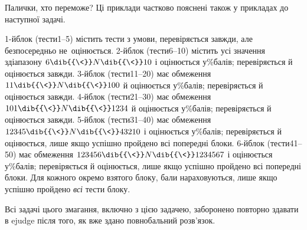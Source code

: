 \begin{problemAllDefault}{Палички, хто переможе?}
\Note Ці приклади частково пояснені також у прикладах до наступної задачі.

{

\Scoring{}\label{text:201819-2-D-scoring-begin}
\mbox{1-й}\nolinebreak[3] блок (тести\nolinebreak[3] \mbox{1--5}) містить тести з умови, перевіряється завжди, але безпосередньо не~оцінюється.
%
\mbox{2-й}\nolinebreak[3] блок (тести\nolinebreak[3] \mbox{6--10}) містить усі значення з\nolinebreak[3] діапазону $6\dib{{\<}}N\dib{{\<}}10$ і оцінюється у\%\nolinebreak[3] балів; перевіряється й оцінюється завжди.
%
\mbox{3-й}\nolinebreak[3] блок (тести\nolinebreak[3] \mbox{11--20}) має обмеження $11\dib{{\<}}N\dib{{\<}}100$ й оцінюється у\%\nolinebreak[3] балів; перевіряється й оцінюється завжди.
%
\mbox{4-й}\nolinebreak[3] блок (тести\nolinebreak[3] \mbox{21--30}) має обмеження $101\dib{{\<}}N\dib{{\<}}1234$ й оцінюється у\%\nolinebreak[3] балів; перевіряється й оцінюється завжди.
%
\mbox{5-й}\nolinebreak[3] блок (тести\nolinebreak[3] \mbox{31--40}) має обмеження $12345\dib{{\<}}N\dib{{\<}}43210$ і оцінюється у\%\nolinebreak[3] балів; перевіряється й оцінюється, лише якщо успішно пройдено всі попередні блоки.
%
\mbox{6-й}\nolinebreak[3] блок (тести\nolinebreak[3] \mbox{41--50}) має обмеження $123456\dib{{\<}}N\dib{{\<}}1234567$ і оцінюється у\%\nolinebreak[3] балів; перевіряється й оцінюється, лише якщо успішно пройдено всі попередні блоки.
%
Для кожного окремо взятого блоку, бали нараховуються, лише якщо успішно пройдено \emph{всі} тести блоку.\label{text:201819-2-D-scoring-end}

}

\ifStatementOnly
\vfill\par
Всі задачі цього змагання, включно з цією задачею, заборонено повторно здавати в ejudge після того, як вже здано повнобальний розв'язок.
\fi

\end{problemAllDefault}